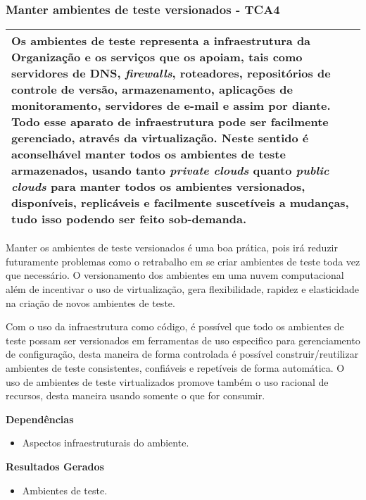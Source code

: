 \subsubsection{Manter ambientes de teste versionados - TCA4}
\label{sec:tca3}

\begin{table}[H]
\centering
\begin{tabular}{|p{130mm}|}
\hline
Os ambientes de teste representa a infraestrutura da Organização e os serviços que os apoiam, tais como servidores de DNS, \textit{firewalls}, roteadores, repositórios de controle de versão, armazenamento, aplicações de monitoramento, servidores de e-mail e assim por diante. Todo esse aparato de infraestrutura pode ser facilmente gerenciado, através da virtualização. Neste sentido é aconselhável manter todos os ambientes de teste armazenados, usando tanto \textit{private clouds} quanto \textit{public clouds} para manter todos os ambientes versionados, disponíveis, replicáveis e facilmente suscetíveis a mudanças, tudo isso podendo ser feito sob-demanda. \\ 
\hline
\end{tabular}
\end{table}

Manter os ambientes de teste versionados é uma boa prática, pois irá reduzir futuramente problemas como o retrabalho em se criar ambientes de teste toda vez que necessário. O versionamento dos ambientes em uma nuvem computacional além de incentivar o uso de virtualização, gera flexibilidade, rapidez e elasticidade na criação de novos ambientes de teste.

Com o uso da infraestrutura como código, é possível que todo os ambientes de teste possam ser versionados em ferramentas de uso especifico para gerenciamento de configuração, desta maneira de forma controlada é possível construir/reutilizar ambientes de teste consistentes, confiáveis e repetíveis de forma automática. O uso de ambientes de teste virtualizados promove também o uso racional de recursos, desta maneira usando somente o que for consumir.

\textbf{Dependências}
\begin{itemize}
    \item Aspectos infraestruturais do ambiente.
\end{itemize}

\textbf{Resultados Gerados}
\begin{itemize}
    \item Ambientes de teste.

\end{itemize}

